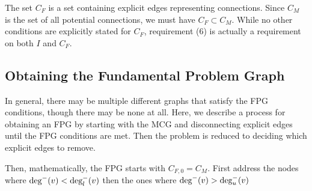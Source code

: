 The set $C_F$ is a set containing explicit edges representing connections. Since $C_M$ is the set of all potential connections, we must have $C_F \subset C_M$. While no other conditions are explicitly stated for $C_F$, requirement (6) is actually a requirement on both $I$ and $C_F$.

\subsection{Obtaining the Fundamental Problem Graph}
In general, there may be multiple different graphs that satisfy the FPG conditions, though there may be none at all. Here, we describe a process for obtaining an FPG by starting with the MCG and disconnecting explicit edges until the FPG conditions are met. Then the problem is reduced to deciding which explicit edges to remove.

Then, mathematically, the FPG starts with $C_{F,0} = C_M$.
First address the nodes where $\textrm{deg}^-(v) < \textrm{deg}_l^-(v)$ then the ones where $\textrm{deg}^-(v) > \textrm{deg}_u^-(v)$

